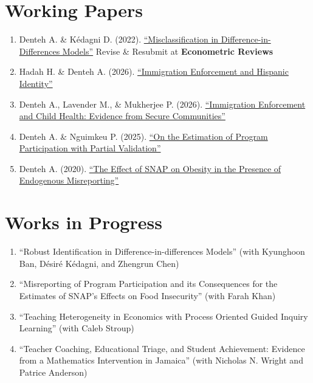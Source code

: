 \documentclass[12pt,letterpaper]{article}
\begin{document}
\section*{Working Papers}
\begin{enumerate}[resume]
\item Denteh A. \& K\'edagni D. (2022). \href{https://doi.org/10.48550/arXiv.2207.11890}{``Misclassification in Difference-in-Differences Models''} Revise \& Resubmit at \textbf{Econometric Reviews}
\item Hadah H. \& Denteh A. (2026). \href{https://papers.ssrn.com/sol3/papers.cfm?abstract_id=6226541}{``Immigration Enforcement and Hispanic Identity''}
\item Denteh A., Lavender M., \& Mukherjee P. (2026). \href{https://ssrn.com/abstract=7562278}{``Immigration Enforcement and Child Health: Evidence from Secure Communities''}
\item Denteh A. \& Nguimkeu P. (2025). \href{https://doi.org/10.48550/arXiv.2512.14616}{``On the Estimation of Program Participation with Partial Validation''}
\item Denteh A. (2020). \href{https://austindenteh.com/wp-content/uploads/2021/02/snap_obesity_two_step_12_2020.pdf}{``The Effect of SNAP on Obesity in the Presence of Endogenous Misreporting''}
\end{enumerate}

\section*{Works in Progress}
 \begin{enumerate}[resume]
\item ``Robust Identification in Difference-in-differences Models'' (with Kyunghoon Ban, D\'esir\'e K\'edagni, and Zhengrun Chen)
 \item``Misreporting of Program Participation and its Consequences for the Estimates of SNAP’s Effects on Food Insecurity'' (with Farah Khan)
\item ``Teaching Heterogeneity in Economics with Process Oriented Guided Inquiry Learning'' (with Caleb Stroup)
\item ``Teacher Coaching, Educational Triage, and Student Achievement: Evidence from a Mathematics Intervention in Jamaica'' (with Nicholas N. Wright and Patrice Anderson)

 \end{enumerate}
\end{document}
